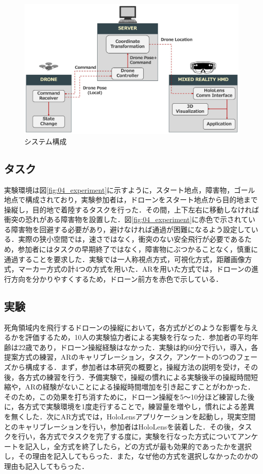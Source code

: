 \documentclass[submit,techrep]{ipsj}
\begin{document}
\begin{figure}[tb]
\centering
\includegraphics[width=\linewidth]{img/04_system.eps}
\caption{システム構成}
\label{fig:04_system}
\end{figure}


\subsection{タスク}
実験環境は図\ref{fig:04_experiment}に示すように，スタート地点，障害物，ゴール地点で構成されており，実験参加者は，ドローンをスタート地点から目的地まで操縦し，目的地で着陸するタスクを行った．その間，上下左右に移動しなければ衝突の恐れがある障害物を設置した．図\ref{fig:04_experiment}に赤色で示されている障害物を回避する必要があり，避けなければ通過が困難になるよう設定している．実際の狭小空間では，速さではなく，衝突のない安全飛行が必要であるため，参加者にはタスクの早期終了ではなく，障害物にぶつかることなく，慎重に通過することを要求した．実験では一人称視点方式，可視化方式，距離画像方式，マーカー方式の計4つの方式を用いた．ARを用いた方式では，ドローンの進行方向を分かりやすくするため，ドローン前方を赤色で示している．


\subsection{実験}
死角領域内を飛行するドローンの操縦において，各方式がどのような影響を与えるかを評価するため，10人の実験協力者による実験を行なった．参加者の平均年齢は22歳であり，ドローン操縦経験はなかった．実験は約60分で行い，導入，各提案方式の練習，ARのキャリブレーション，タスク，アンケートの5つのフェーズから構成する．まず，参加者は本研究の概要と，操縦方法の説明を受け，その後，各方式の練習を行う．予備実験で，操縦の慣れによる実験後半の操縦時間短縮や，ARの経験がないことによる操縦時間増加を引き起こすことがわかった．そのため，この効果を打ち消すために，ドローン操縦を5〜10分ほど練習した後に，各方式で実験環境を1度走行することで，練習量を増やし，慣れによる差異を無くした．次にAR方式では，HoloLensアプリケーションを起動し，現実空間とのキャリブレーションを行い，参加者はHoloLensを装着した．その後，タスクを行い，各方式でタスクを完了する度に，実験を行なった方式についてアンケートを記入し，全方式を終了したら，どの方式が最も効果的であったかを選択し，その理由を記入してもらった．また，なぜ他の方式を選択しなかったのかの理由も記入してもらった．
\end{document}
